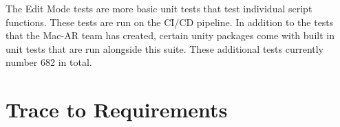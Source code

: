\documentclass[12pt, titlepage]{article}
\begin{document}
The Edit Mode tests are more basic unit tests that test individual script functions. These tests are run on the CI/CD pipeline. In addition to the tests that the Mac-AR team has created, certain unity packages come with built in unit tests that are run alongside this suite. These additional tests currently number 682 in total.
\section{Trace to Requirements}
\begin{landscape}

\begin{table}[H]
\begin{adjustwidth}{-0.1in}{-1in}
\end{adjustwidth}
\end{table}
\end{landscape}
\end{document}

